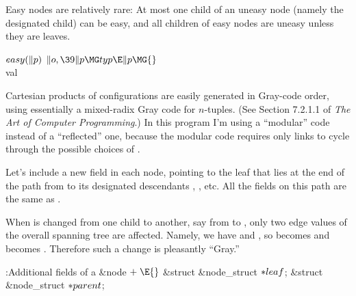 Easy nodes are relatively rare: At most one child of an uneasy node
(namely the designated child) can be easy, and all children of easy nodes
are uneasy unless they are leaves.

\Y\B\4\D$\\{easy}(\|p)$ \5
$\|o,\39\|p\MG\\{typ}\E\|p\MG{}$\\{val}\par
\fi

Cartesian products of configurations are easily generated
in Gray-code
order, using essentially a mixed-radix Gray code for $n$-tuples.
(See Section 7.2.1.1 of {\sl The Art of Computer Programming}.) In this
program I'm using a ``modular'' code instead of a ``reflected'' one, because
the modular code requires only  links to cycle through the
possible choices of .

Let's include a new field  in each node, pointing to the
leaf
that lies at the end of the path from  to its designated
descendants , , etc. All the %
 fields
on this path are the same as .

When  is changed from one child to another, say from  to ,
only two edge values of the overall spanning tree are affected.
Namely, we have  and , so
 becomes  and 
becomes . Therefore such a change is pleasantly ``Gray.''

\Y\B\4:Additional fields of a \&{node}\X${}\mathrel+\E{}$\6
\&{struct} \&{node\_struct} ${}{*}\\{leaf}{}$;\6
\&{struct} \&{node\_struct} ${}{*}\\{parent}{}$;\par
\fi

